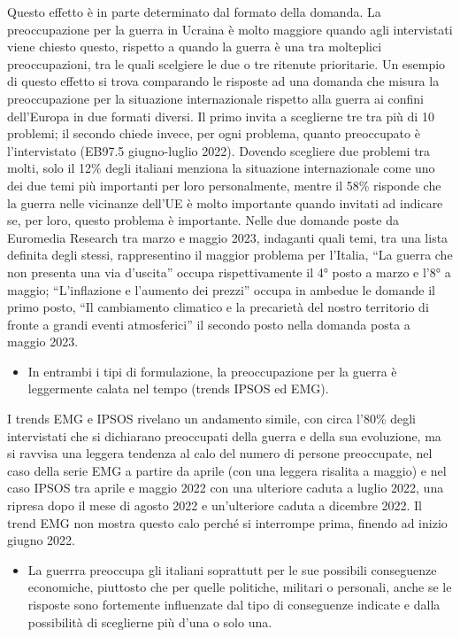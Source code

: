 \documentclass[
  openany]{book}
\providecommand{\tightlist}{%
  \setlength{\itemsep}{0pt}\setlength{\parskip}{0pt}}
\begin{document}
Questo effetto è in parte determinato dal formato della domanda. La preoccupazione per la guerra in Ucraina è molto maggiore quando agli intervistati viene chiesto questo, rispetto a quando la guerra è una tra molteplici preoccupazioni, tra le quali scelgiere le due o tre ritenute prioritarie. Un esempio di questo effetto si trova comparando le risposte ad una domanda che misura la preoccupazione per la situazione internazionale rispetto alla guerra ai confini dell'Europa in due formati diversi. Il primo invita a sceglierne tre tra più di 10 problemi; il secondo chiede invece, per ogni problema, quanto preoccupato è l'intervistato (EB97.5 giugno-luglio 2022). Dovendo scegliere due problemi tra molti, solo il 12\% degli italiani menziona la situazione internazionale come uno dei due temi più importanti per loro personalmente, mentre il 58\% risponde che la guerra nelle vicinanze dell'UE è molto importante quando invitati ad indicare se, per loro, questo problema è importante.
Nelle due domande poste da Euromedia Research tra marzo e maggio 2023, indaganti quali temi, tra una lista definita degli stessi, rappresentino il maggior problema per l'Italia, ``La guerra che non presenta una via d'uscita'' occupa rispettivamente il 4° posto a marzo e l'8° a maggio; ``L'inflazione e l'aumento dei prezzi'' occupa in ambedue le domande il primo posto, ``Il cambiamento climatico e la precarietà del nostro territorio di fronte a grandi eventi atmosferici'' il secondo posto nella domanda posta a maggio 2023.

\begin{itemize}
\tightlist
\item
  In entrambi i tipi di formulazione, la preoccupazione per la guerra è leggermente calata nel tempo (trends IPSOS ed EMG).
\end{itemize}

I trends EMG e IPSOS rivelano un andamento simile, con circa l'80\% degli intervistati che si dichiarano preoccupati della guerra e della sua evoluzione, ma si ravvisa una leggera tendenza al calo del numero di persone preoccupate, nel caso della serie EMG a partire da aprile (con una leggera risalita a maggio) e nel caso IPSOS tra aprile e maggio 2022 con una ulteriore caduta a luglio 2022, una ripresa dopo il mese di agosto 2022 e un'ulteriore caduta a dicembre 2022. Il trend EMG non mostra questo calo perché si interrompe prima, finendo ad inizio giugno 2022.

\begin{itemize}
\tightlist
\item
  La guerrra preoccupa gli italiani soprattutt per le sue possibili conseguenze economiche, piuttosto che per quelle politiche, militari o personali, anche se le risposte sono fortemente influenzate dal tipo di conseguenze indicate e dalla possibilità di sceglierne più d'una o solo una.
\end{itemize}
\end{document}
